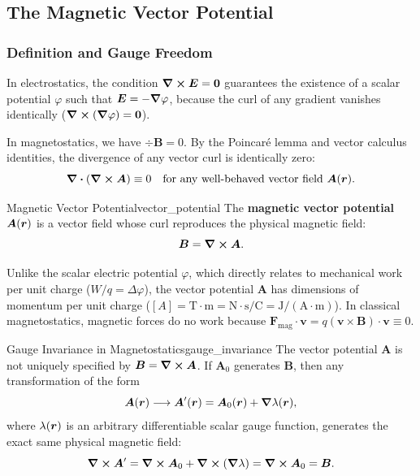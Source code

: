 \subsection{The Magnetic Vector Potential}

\subsubsection{Definition and Gauge Freedom}

In electrostatics, the condition $\curl \bm{E} = \bm{0}$ guarantees the existence of a scalar potential $\varphi$ such that $\bm{E} = -\grad \varphi$, because the curl of any gradient vanishes identically ($\curl(\grad \varphi) = \bm{0}$).

In magnetostatics, we have $\div \bm{B} = 0$. By the Poincaré lemma and vector calculus identities, the divergence of any vector curl is identically zero:
\begin{equation}
    \div(\curl \bm{A}) \equiv 0 \quad \text{for any well-behaved vector field } \bm{A}(\bm{r}).
\end{equation}

\begin{definition}{Magnetic Vector Potential}{vector_potential}
    The \textbf{magnetic vector potential} $\bm{A}(\bm{r})$ is a vector field whose curl reproduces the physical magnetic field:
    \begin{equation}
        \bm{B} = \curl \bm{A}.
    \end{equation}
\end{definition}

Unlike the scalar electric potential $\varphi$, which directly relates to mechanical work per unit charge ($W/q = \Delta \varphi$), the vector potential $\bm{A}$ has dimensions of momentum per unit charge ($[A] = \text{T}\cdot\text{m} = \text{N}\cdot\text{s}/\text{C} = \text{J}/(\text{A}\cdot\text{m})$). In classical magnetostatics, magnetic forces do no work because $\bm{F}_{\text{mag}} \cdot \bm{v} = q(\bm{v}\times \bm{B})\cdot \bm{v} \equiv 0$.

\begin{proposition}{Gauge Invariance in Magnetostatics}{gauge_invariance}
    The vector potential $\bm{A}$ is not uniquely specified by $\bm{B} = \curl \bm{A}$. If $\bm{A}_0$ generates $\bm{B}$, then any transformation of the form
    \begin{equation}
        \bm{A}(\bm{r}) \longrightarrow \bm{A}'(\bm{r}) = \bm{A}_0(\bm{r}) + \grad \lambda(\bm{r}),
    \end{equation}
    where $\lambda(\bm{r})$ is an arbitrary differentiable scalar gauge function, generates the exact same physical magnetic field:
    \begin{equation}
        \curl \bm{A}' = \curl \bm{A}_0 + \curl(\grad \lambda) = \curl \bm{A}_0 = \bm{B}.
    \end{equation}
\end{proposition}

